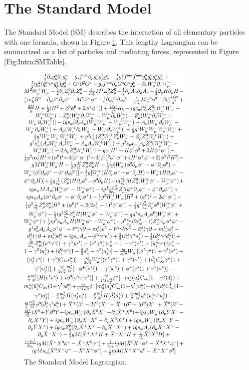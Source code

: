 \section{The Standard Model}
The Standard Model (SM) describes the interaction of all elementary particles with one formula, shown in Figure \ref{Fig:Intro:SML}. This lengthy Lagrangian can be summarized as a list of particles and mediating forces, represented in Figure \ref{Fig:Intro:SMTable}.
\begin{figure}[ht]
    \centering
        \includegraphics[width=0.75\textwidth]{F1/StandardModelEquation}
        \caption{The Standard Model Lagrangian.}
        \label{Fig:Intro:SML}
\end{figure}
